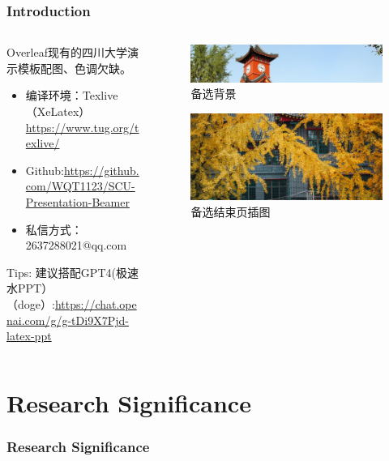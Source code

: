 \documentclass{beamer}
\begin{document}
{\begin{frame}
  \frametitle{Introduction}
\begin{columns}[T]
    \begin{column}{0.6\textwidth}
\setlength{\parindent}{2em}
Overleaf现有的四川大学演示模板配图、色调欠缺。

\begin{itemize}
\item 编译环境：Texlive（XeLatex）\url{https://www.tug.org/texlive/}
\item Github:\url{https://github.com/WQT1123/SCU-Presentation-Beamer}
\item 私信方式：2637288021@qq.com
\end{itemize}
\large Tips:
建议搭配GPT4(极速水PPT）（doge）:\url{https://chat.openai.com/g/g-tDi9X7Pjd-latex-ppt}
    \end{column}
    \begin{column}{0.4\textwidth}
      \begin{figure}[t]
        \includegraphics[width=0.8\linewidth,height=0.3\textheight]{background1.jpg}
        \caption{备选背景}
      \end{figure}
\vspace{-0.5cm}
      \begin{figure}
        \includegraphics[width=0.8\linewidth,height=0.3\textheight]{end1.jpg}
        \caption{备选结束页插图}
      \end{figure}
    \end{column}

  \end{columns}


\end{frame}
\section{Research Significance}
\begin{frame}
  \frametitle{Research Significance}


\end{frame}}
\end{document}
